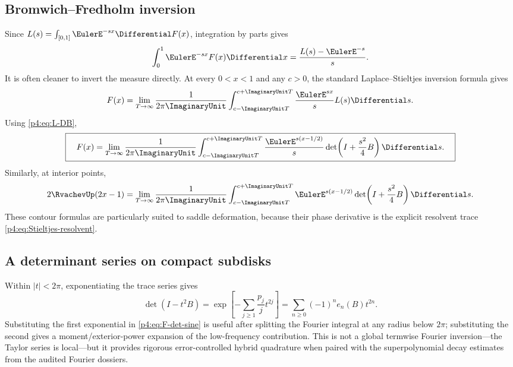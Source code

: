 \documentclass[11pt]{article}
\theoremstyle{definition}
\theoremstyle{remark}
\begin{document}
\subsection{Bromwich--Fredholm inversion}

Since \(L(s)=\int_{[0,1]}\EulerE^{-sx}\Differential F(x)\), integration by parts gives
\begin{equation}
 \int_0^1\EulerE^{-sx}F(x)\Differential x=\frac{L(s)-\EulerE^{-s}}s.
 \label{p4:eq:Laplace-CDF}
\end{equation}
It is often cleaner to invert the measure directly.  At every \(0<x<1\) and any
\(c>0\), the standard Laplace--Stieltjes inversion formula gives
\begin{equation}
 F(x)=\lim_{T\to\infty}\frac1{2\pi\ImaginaryUnit}
 \int_{c-\ImaginaryUnit T}^{c+\ImaginaryUnit T}\frac{\EulerE^{sx}}sL(s)\Differential s.
 \label{p4:eq:Bromwich-F}
\end{equation}
Using \eqref{p4:eq:L-DB},
\begin{equation}
 \boxed{\quad
 F(x)=\lim_{T\to\infty}\frac1{2\pi\ImaginaryUnit}
 \int_{c-\ImaginaryUnit T}^{c+\ImaginaryUnit T}
 \frac{\EulerE^{s(x-1/2)}}s\det\!\left(I+\frac{s^2}{4}B\right)\Differential s.
 \quad}
 \label{p4:eq:Bromwich-Fredholm-F}
\end{equation}
Similarly, at interior points,
\begin{equation}
 2\RvachevUp(2x-1)=\lim_{T\to\infty}\frac1{2\pi\ImaginaryUnit}
 \int_{c-\ImaginaryUnit T}^{c+\ImaginaryUnit T}
 \EulerE^{s(x-1/2)}\det\!\left(I+\frac{s^2}{4}B\right)\Differential s.
 \label{p4:eq:Bromwich-up}
\end{equation}
These contour formulas are particularly suited to saddle deformation, because their
phase derivative is the explicit resolvent trace \eqref{p4:eq:Stieltjes-resolvent}.

\subsection{A determinant series on compact subdisks}

Within \(|t|<2\pi\), exponentiating the trace series gives
\begin{equation}
 \det(I-t^2B)=
 \exp\!\left[-\sum_{j\ge1}\frac{p_j}{j}t^{2j}\right]
 =\sum_{n\ge0}(-1)^ne_n(B)t^{2n}.
 \label{p4:eq:det-local-series}
\end{equation}
Substituting the first exponential in \eqref{p4:eq:F-det-sine} is useful after splitting
the Fourier integral at any radius below \(2\pi\); substituting the second gives a
moment/exterior-power expansion of the low-frequency contribution.  This is not a
global termwise Fourier inversion---the Taylor series is local---but it provides
rigorous error-controlled hybrid quadrature when paired with the superpolynomial
decay estimates from the audited Fourier dossiers.
\end{document}
